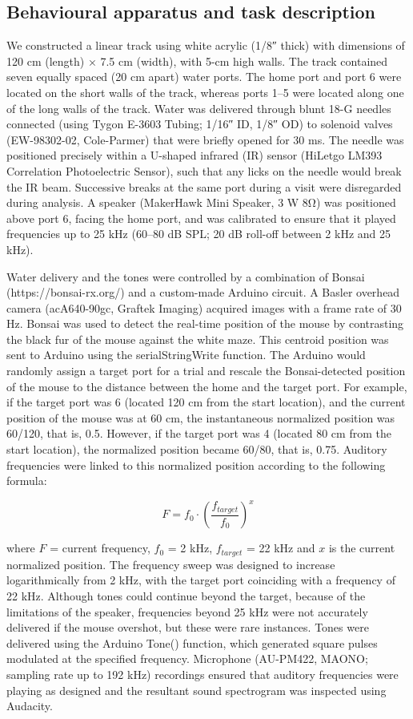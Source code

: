 \subsection{Behavioural apparatus and task description}

We constructed a linear track using white acrylic (1/8″ thick) with dimensions of 120 cm (length) × 7.5 cm (width), with 5-cm high walls. The track contained seven equally spaced (20 cm apart) water ports. The home port and port 6 were located on the short walls of the track, whereas ports 1--5 were located along one of the long walls of the track. Water was delivered through blunt 18-G needles connected (using Tygon E-3603 Tubing; 1/16″ ID, 1/8″ OD) to solenoid valves (EW-98302-02, Cole-Parmer) that were briefly opened for 30 ms. The needle was positioned precisely within a U-shaped infrared (IR) sensor (HiLetgo LM393 Correlation Photoelectric Sensor), such that any licks on the needle would break the IR beam. Successive breaks at the same port during a visit were disregarded during analysis. A speaker (MakerHawk Mini Speaker, 3 W 8Ω) was positioned above port 6, facing the home port, and was calibrated to ensure that it played frequencies up to 25 kHz (60--80 dB SPL; 20 dB roll-off between 2 kHz and 25 kHz).

Water delivery and the tones were controlled by a combination of Bonsai (https://bonsai-rx.org/) and a custom-made Arduino circuit. A Basler overhead camera (acA640-90gc, Graftek Imaging) acquired images with a frame rate of 30 Hz. Bonsai was used to detect the real-time position of the mouse by contrasting the black fur of the mouse against the white maze. This centroid position was sent to Arduino using the serialStringWrite function. The Arduino would randomly assign a target port for a trial and rescale the Bonsai-detected position of the mouse to the distance between the home and the target port. For example, if the target port was 6 (located 120 cm from the start location), and the current position of the mouse was at 60 cm, the instantaneous normalized position was 60/120, that is, 0.5. However, if the target port was 4 (located 80 cm from the start location), the normalized position became 60/80, that is, 0.75. Auditory frequencies were linked to this normalized position according to the following formula:

\[
F = f_0 \cdot \left(\frac{f_{target}}{f_0}\right)^x
\]

where $F$ = current frequency, $f_0$ = 2 kHz, $f_{target}$ = 22 kHz and $x$ is the current normalized position. The frequency sweep was designed to increase logarithmically from 2 kHz, with the target port coinciding with a frequency of 22 kHz. Although tones could continue beyond the target, because of the limitations of the speaker, frequencies beyond 25 kHz were not accurately delivered if the mouse overshot, but these were rare instances. Tones were delivered using the Arduino Tone() function, which generated square pulses modulated at the specified frequency. Microphone (AU-PM422, MAONO; sampling rate up to 192 kHz) recordings ensured that auditory frequencies were playing as designed and the resultant sound spectrogram was inspected using Audacity.

